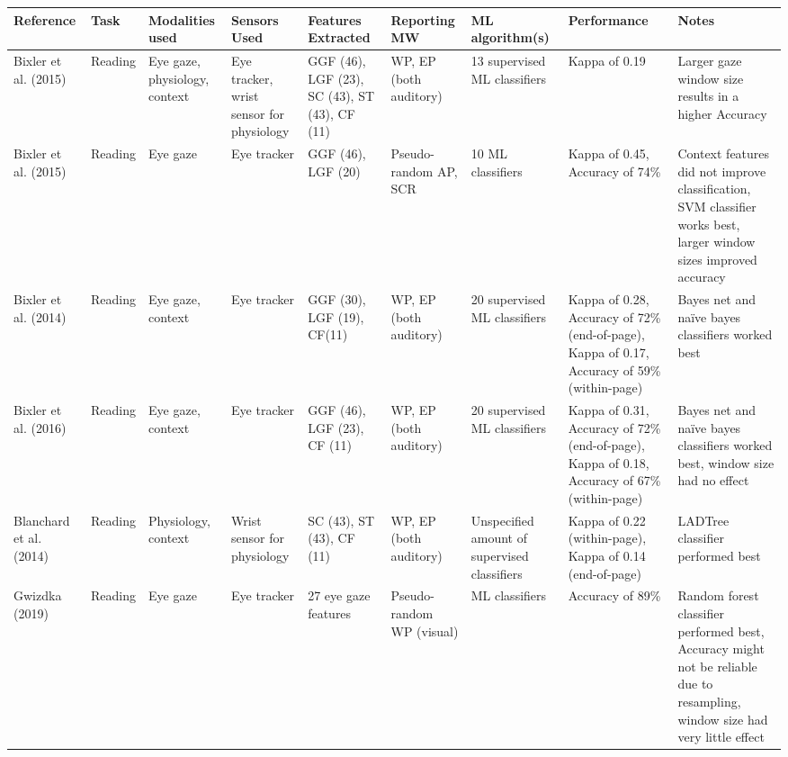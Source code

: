 \begin{ThreePartTable}
\small %
        \begin{xtabular}{P{20mm}P{24mm}P{24mm}P{28mm}P{28mm}P{21mm}P{26mm}P{24mm}P{42mm}}
                \toprule
                Reference & Task & Modalities used & Sensors Used & Features Extracted \footnotemark[1] & Reporting MW \footnotemark[2] & ML algorithm(s) & Performance & Notes\\
                \midrule
                Bixler et al. (2015) \cite{Bixler2015AutomaticPhysiology} & Reading & Eye gaze, physiology, context & Eye tracker, wrist sensor for physiology & GGF (46), LGF (23), SC (43), ST (43), CF (11) & WP, EP (both auditory) & 13 supervised ML classifiers & Kappa of 0.19 & Larger gaze window size results in a higher Accuracy \\ \midrule
                Bixler et al. (2015) \cite{Bixler2015AutomaticAwareness} & Reading & Eye gaze & Eye tracker & GGF (46), LGF (20) & Pseudo-random AP, SCR & 10 ML classifiers & Kappa of 0.45, Accuracy of 74\% & Context features did not improve classification, SVM classifier works best, larger window sizes improved accuracy\\ \midrule
                Bixler et al. (2014) \cite{Bixler2014TowardWanderingd} & Reading & Eye gaze, context & Eye tracker & GGF (30), LGF (19), CF(11) & WP, EP (both auditory) & 20 supervised ML classifiers & Kappa of 0.28, Accuracy of 72\% (end-of-page), Kappa of 0.17, Accuracy of 59\% (within-page) & Bayes net and naïve bayes classifiers worked best \\ \midrule
                Bixler et al. (2016) \cite{Bixler2016AutomaticReadingd} & Reading & Eye gaze, context & Eye tracker & GGF (46), LGF (23), CF (11) & WP, EP (both auditory) & 20 supervised ML classifiers & Kappa of 0.31, Accuracy of 72\% (end-of-page), Kappa of 0.18, Accuracy of 67\% (within-page) & Bayes net and naïve bayes classifiers worked best, window size had no effect \\ \midrule
                Blanchard et al. (2014) \cite{Blanchard2014AutomatedLearning} & Reading & Physiology, context & Wrist sensor for physiology & SC (43), ST (43), CF (11) & WP, EP (both auditory) & Unspecified amount of supervised classifiers & Kappa of 0.22 (within-page), Kappa of 0.14 (end-of-page) & LADTree classifier performed best \\ \midrule
                Gwizdka (2019) \cite{Gwizdka2019ExploringTasks} & Reading & Eye gaze & Eye tracker & 27 eye gaze features & Pseudo-random WP (visual) & ML classifiers & Accuracy of 89\% & Random forest classifier performed best, Accuracy might not be reliable due to resampling, window size had very little effect \\ \midrule

\end{xtabular}
\end{ThreePartTable}
